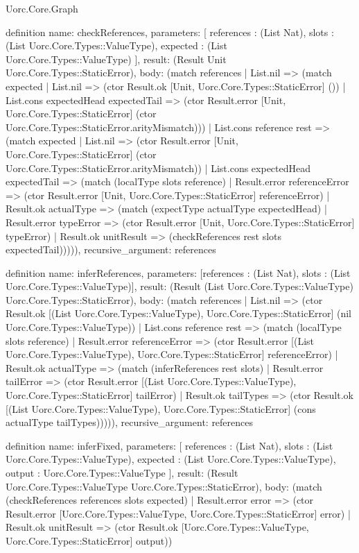 \begin{lexlean}{Uorc.Core.Graph}
\begin{semanticmodule}
definition{
  name: checkReferences,
  parameters: [
    references : (List Nat),
    slots : (List Uorc.Core.Types::ValueType),
    expected : (List Uorc.Core.Types::ValueType)
  ],
  result: (Result Unit Uorc.Core.Types::StaticError),
  body: (match references
    | List.nil => (match expected
      | List.nil => (ctor Result.ok [Unit, Uorc.Core.Types::StaticError] ())
      | List.cons expectedHead expectedTail => (ctor Result.error [Unit, Uorc.Core.Types::StaticError] (ctor Uorc.Core.Types::StaticError.arityMismatch)))
    | List.cons reference rest => (match expected
      | List.nil => (ctor Result.error [Unit, Uorc.Core.Types::StaticError] (ctor Uorc.Core.Types::StaticError.arityMismatch))
      | List.cons expectedHead expectedTail => (match (localType slots reference)
        | Result.error referenceError => (ctor Result.error [Unit, Uorc.Core.Types::StaticError] referenceError)
        | Result.ok actualType => (match (expectType actualType expectedHead)
          | Result.error typeError => (ctor Result.error [Unit, Uorc.Core.Types::StaticError] typeError)
          | Result.ok unitResult => (checkReferences rest slots expectedTail))))),
  recursive_argument: references
}

definition{
  name: inferReferences,
  parameters: [references : (List Nat), slots : (List Uorc.Core.Types::ValueType)],
  result: (Result (List Uorc.Core.Types::ValueType) Uorc.Core.Types::StaticError),
  body: (match references
    | List.nil => (ctor Result.ok [(List Uorc.Core.Types::ValueType), Uorc.Core.Types::StaticError] (nil Uorc.Core.Types::ValueType))
    | List.cons reference rest => (match (localType slots reference)
      | Result.error referenceError => (ctor Result.error [(List Uorc.Core.Types::ValueType), Uorc.Core.Types::StaticError] referenceError)
      | Result.ok actualType => (match (inferReferences rest slots)
        | Result.error tailError => (ctor Result.error [(List Uorc.Core.Types::ValueType), Uorc.Core.Types::StaticError] tailError)
        | Result.ok tailTypes => (ctor Result.ok [(List Uorc.Core.Types::ValueType), Uorc.Core.Types::StaticError] (cons actualType tailTypes))))),
  recursive_argument: references
}

definition{
  name: inferFixed,
  parameters: [
    references : (List Nat),
    slots : (List Uorc.Core.Types::ValueType),
    expected : (List Uorc.Core.Types::ValueType),
    output : Uorc.Core.Types::ValueType
  ],
  result: (Result Uorc.Core.Types::ValueType Uorc.Core.Types::StaticError),
  body: (match (checkReferences references slots expected)
    | Result.error error => (ctor Result.error [Uorc.Core.Types::ValueType, Uorc.Core.Types::StaticError] error)
    | Result.ok unitResult => (ctor Result.ok [Uorc.Core.Types::ValueType, Uorc.Core.Types::StaticError] output))
}


\end{semanticmodule}
\end{lexlean}
